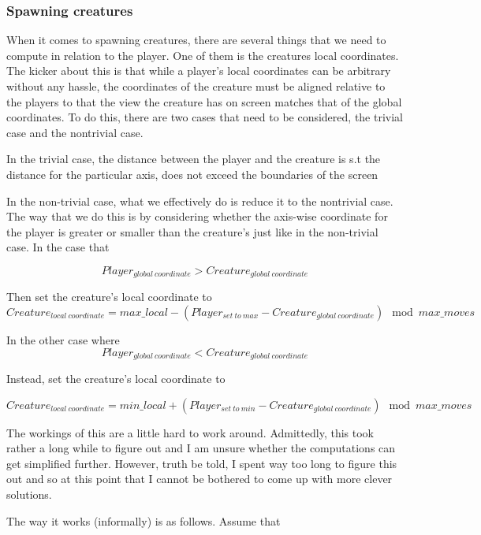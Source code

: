 \documentclass{article}
\begin{document}
\subsubsection{Spawning creatures}
When it comes to spawning creatures, there are several things that we need to compute in relation to the player. One of them is the creatures local coordinates. The kicker about this is that while a player's local coordinates can be arbitrary without any hassle, the coordinates of the creature must be aligned relative to the players to that the view the creature has on screen matches that of the global coordinates. To do this, there are two cases that need to be considered, the trivial case and the nontrivial case. \newline

In the trivial case, the distance between the player and the creature is s.t the distance for the particular axis, does not exceed the boundaries of the screen \newline

In the non-trivial case, what we effectively do is reduce it to the nontrivial case. The way that we do this is by considering whether the axis-wise coordinate for the player is greater or smaller than the creature's just like in the non-trivial case. In the case that

\[ Player_{global  \:coordinate} > Creature_{global \: coordinate} \]

Then set the creature's local coordinate to
\[ Creature_{local \: coordinate} = max\_local - (Player_{set \: to \: max} - Creature_{global \: coordinate} ) \mod  max\_moves  \]


In the other case where 
\[ Player_{global  \:coordinate} < Creature_{global \: coordinate} \]

Instead, set the creature's local coordinate to

\[ Creature_{local \: coordinate} = min\_local + (Player_{set \: to \: min} - Creature_{global \: coordinate} ) \mod  max\_moves  \]

The workings of this are a little hard to work around. Admittedly, this took rather a long while to figure out and I am unsure whether the computations can get simplified further. However, truth be told, I spent way too long to figure this out and so at this point that I cannot be bothered to come up with more clever solutions. \newline

The way it works (informally) is as follows. Assume that 
\end{document}
